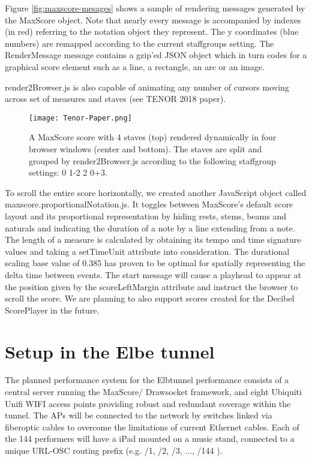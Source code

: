 Figure \ref{fig:maxscore-mesages} shows a sample of rendering messages generated by the MaxScore object. Note that nearly every message is accompanied by indexes (in red) referring to the notation object they represent. The y coordinates (blue numbers) are remapped according to the current staffgroups setting. The RenderMessage message contains a gzip’ed JSON object which in turn codes for a graphical score element such as a line, a rectangle, an arc or an image.

render2Browser.js is also capable of animating any number of cursors moving across set of measures and staves (see TENOR 2018 paper).

\begin{figure*}[h]
    \centering
    \begin{minipage}{1.\textwidth}
        \centering
        \texttt{[image: Tenor-Paper.png]} 
       	\caption{A MaxScore score with 4 staves (top) rendered dynamically in four browser windows (center and bottom). The staves are split and grouped by render2Browser.js according to the following staffgroup settings: 0 1-2 2 0+3.
\label{fig:Tenor-Paper}}
    \end{minipage}
\end{figure*}


To scroll the entire score horizontally, we created another JavaScript object called maxscore.proportionalNotation.js. It toggles between MaxScore’s default score layout and its proportional representation by hiding rests, stems, beams and naturals and indicating the duration of a note by a line extending from a note. The length of a measure is calculated by obtaining its tempo and time signature values and taking a setTimeUnit attribute into consideration. The durational scaling base value of 0.385 has proven to be optimal for spatially representing the delta time between events. The start message will cause a playhead to appear at the position given by the scoreLeftMargin attribute and instruct the browser to scroll the score. We are planning to also support scores created for the Decibel ScorePlayer in the future. 



\section{Setup in the Elbe tunnel}
The planned performance system for the Elbtunnel performance consists of a central server running the MaxScore/ Drawsocket framework, and eight Ubiquiti Unifi WIFI access points providing robust and redundant coverage within the tunnel. The APs will be connected to the network by switches linked via fiberoptic cables to overcome the limitations of current Ethernet cables.
Each of the 144 performers will have a iPad mounted on a music stand, connected to a unique URL-OSC routing prefix (e.g. {/1}, {/2}, {/3}, ..., {/144} ). 

